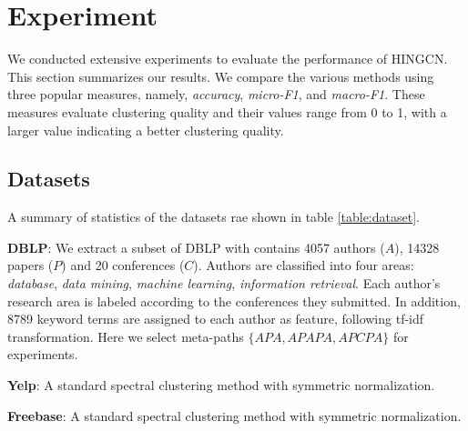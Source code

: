 \section{Experiment}
\label{sec:exp}
We conducted extensive experiments
to evaluate the performance of HINGCN.
This section summarizes our results. 
We compare the various methods using three popular measures, 
namely, \emph{accuracy}, \emph{micro-F1}, and \emph{macro-F1}.
These measures evaluate clustering quality and their values range from 0 to 1, 
with a larger value indicating a better
clustering quality. 

\subsection{Datasets}
A summary of statistics of the datasets rae shown in table \ref{table:dataset}.

\noindent{\small$\bullet$}
\textbf{DBLP}: We extract a subset of DBLP with contains 4057 authors ($A$), 14328 papers ($P$) and 20 conferences ($C$). Authors are classified into four areas: \textit{database}, \textit{data mining}, \textit{machine learning}, \textit{information retrieval}. Each author's research area is labeled according to the conferences they submitted. In addition, 8789 keyword terms are assigned to each author as feature, following tf-idf transformation. Here we select meta-paths $\{APA,APAPA,APCPA\}$ for experiments.

\noindent{\small$\bullet$}
\textbf{Yelp}: A standard spectral clustering method with symmetric normalization.

\noindent{\small$\bullet$}
\textbf{Freebase}: A standard spectral clustering method with symmetric normalization.

